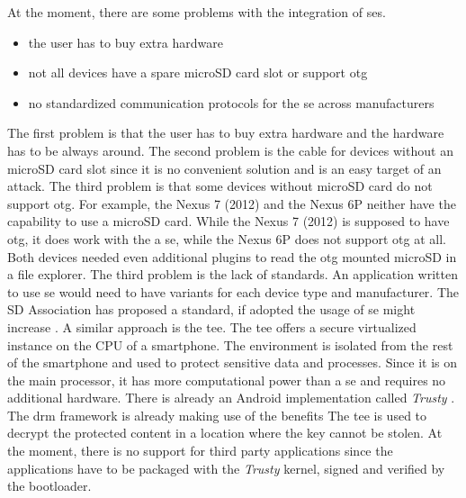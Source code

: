 At the moment, there are some problems with the integration of \gls{se}s.
\begin{itemize}
  \item the user has to buy extra hardware
  \item not all devices have a spare microSD card slot or support \gls{otg}
  \item no standardized communication protocols for the \gls{se} across manufacturers
\end{itemize}
The first problem is that the user has to buy extra hardware and the hardware has to be always around.
The second problem is the cable for devices without an microSD card slot since it is no convenient solution and is an easy target of an attack.
\newline
The third problem is that some devices without microSD card do not support \gls{otg}.
For example, the Nexus 7 (2012) and the Nexus 6P neither have the capability to use a microSD card.
While the Nexus 7 (2012) is supposed to have \gls{otg}, it does work with the a \gls{se}, while the Nexus 6P does not support \gls{otg} at all.
Both devices needed even additional plugins to read the \gls{otg} mounted microSD in a file explorer.
The third problem is the lack of standards.
An application written to use \gls{se} would need to have variants for each device type and manufacturer.
The SD Association has proposed a standard, if adopted the usage of \gls{se} might increase \cite{smartSD}.
\newline
\newline
A similar approach is the \gls{tee}.
The \gls{tee} offers a secure virtualized instance on the CPU of a smartphone.
The environment is isolated from the rest of the smartphone and used to protect sensitive data and processes.
Since it is on the main processor, it has more computational power than a \gls{se} and requires no additional hardware.
There is already an Android implementation called \textit{Trusty} \cite{trusty}.
The  \gls{drm} framework is already making use of the benefits
The \gls{tee} is used to decrypt the protected content in a location where the key cannot be stolen.
At the moment, there is no support for third party applications since the applications have to be packaged with the \textit{Trusty} kernel, signed and verified by the bootloader. \cite{trusty} \cite{teeGlobal}
